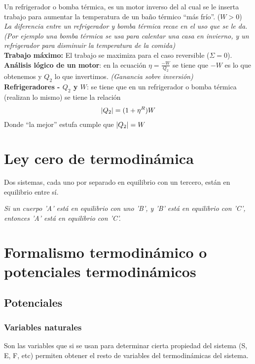 Un refrigerador o bomba térmica, es un motor inverso del al cual se le inserta trabajo para aumentar la temperatura de un baño térmico \enquote{más frío}. ($W >0$)\\

\textit{La diferencia entre un refrigerador y bomba térmica recae en el uso que se le da. (Por ejemplo una bomba térmica se usa para calentar una casa en invierno, y un refrigerador para disminuir la temperatura de la comida)}\\

\textbf{Trabajo máximo:} El trabajo se maximiza para el caso reversible ($\Sigma =0$).\\

\textbf{Análisis lógico de un motor}:\label{plbr-motor}
en la ecuación $\eta = \frac{-W}{Q_2}$ se tiene que $-W$ es lo que obtenemos y $Q_2$ lo que invertimos. \textit{(Ganancia sobre inversión)}\\


\textbf{Refrigeradores - $Q_2$ y $W$}:
\label{refri-q2-w}
se tiene que en un refrigerador o bomba térmica (realizan lo mismo) se tiene la relación
\[\abs{Q_2} = (1 + \eta^R)W\]
Donde \enquote{la mejor} estufa cumple que $\abs{Q_2} = W$

\section{Ley cero de termodinámica}

Dos sistemas, cada uno por separado en equilibrio con un tercero, están en equilibrio entre sí.

\textit{Si un cuerpo ’A’ está en equilibrio con uno ’B’, y ’B’ está en equilibrio con ’C’, entonces ’A’ está en equilibrio con ’C’.}

\section{Formalismo termodinámico o potenciales termodinámicos}
\subsection{Potenciales}

\subsubsection{Variables naturales} Son las variables que si se usan para determinar cierta propiedad del sistema (S, E, F, etc) permiten obtener el resto de variables del termodinámicas del sistema.\\

